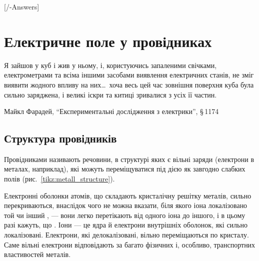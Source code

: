 
[\currfilebase/\currfilebase-Answers]
\chapter{Електричне поле у провідниках}\label{\currfilebase}\hypertarget{FieldInMetalls}{}
\graphicspath{{\currfilebase/Pictures}}
\epigraph{\Alexander Я зайшов у куб і жив у ньому, і, користуючись запаленими свічками, електрометрами та всіма
іншими засобами виявлення електричних станів, не зміг виявити жодного впливу на них\ldots\ хоча весь цей час
зовнішня поверхня куба була сильно заряджена, і великі іскри та китиці зривалися з усіх її частин.}{Майкл Фарадей,
\enquote{Експериментальні дослідження з електрики}, \S\,1174}


\section{Структура провідників}\hypertarget{conductor-structure}{}



Провідниками називають речовини, в структурі яких є вільні заряди (електрони в металах,
наприклад), які можуть переміщуватися під дією як завгодно слабких полів (рис.~\ref{tikz:metall_structure}).
\begin{wrapstuff}[o, top=0, type=figure, width=0.32\linewidth, belowsep=1em, abovesep=1em]
    \centering
    \caption{Модель будови металу (електронний газ у кристалічній решітці)}
    \label{tikz:metall_structure}
\end{wrapstuff}


Електронні оболонки атомів, що складають кристалічну решітку металів, сильно
перекриваються, внаслідок чого не можна вказати, біля якого іона локалізовано той чи інший
, --- вони легко перетікають від одного іона до іншого,
і в цьому разі кажуть, що . Іони --- це ядра й
електрони внутрішніх оболонок, які сильно локалізовані. Електрони, які делокалізовані,
вільно переміщаються по кристалу. Саме вільні електрони відповідають за багато фізичних і,
особливо, транспортних властивостей металів.


